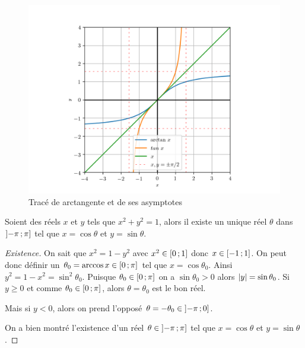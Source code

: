 \begin{figure}
  \centering
  \includegraphics[scale=0.7]{arctan.png}
  \caption{Tracé de arctangente et de ses asymptotes}
  \label{fig:tracearctangente}
\end{figure}
%
\begin{theo}
  \label{chap1-theo:thetasin}
  Soient des réels \(x\) et \(y\) tels que \(x^2+y^2=1\), alors il existe un unique réel \(\theta\) dans \(\left] -\pi \, ;  \pi \right]\) tel que \(x=\cos \theta\) et \(y=\sin \theta\).
\end{theo}
\begin{proof}[Existence]
  On sait que \(x^2=1-y^2\) avec \(x^2 \in \left[ 0 \, ;  1 \right]\) donc \(x \in \left[ -1 \, ;  1 \right]\). On peut donc définir un \(\theta_0=\arccos x \in \left[ 0 \, ;  \pi \right]\) tel que \(x=\cos \theta_0\). Ainsi \(y^2=1-x^2=\sin^2 \theta_0\). Puisque \(\theta_0 \in \left[ 0 \, ;  \pi \right]\) on a \(\sin \theta_0>0\) alors \(\left\lvert y\right\rvert=\sin \theta_0\).
Si \(y \geqslant 0\) et comme \(\theta_0 \in \left[ 0 \, ;  \pi \right]\), alors \(\theta=\theta_0\) est le bon réel.

Mais si \(y<0\), alors on prend l'opposé \(\theta=-\theta_0 \in \left] -\pi \, ;  0 \right]\).

On a bien montré l'existence d'un réel \(\theta \in \left] -\pi \, ;  \pi \right]\) tel que \(x=\cos \theta\) et \(y=\sin \theta\).
\end{proof}
